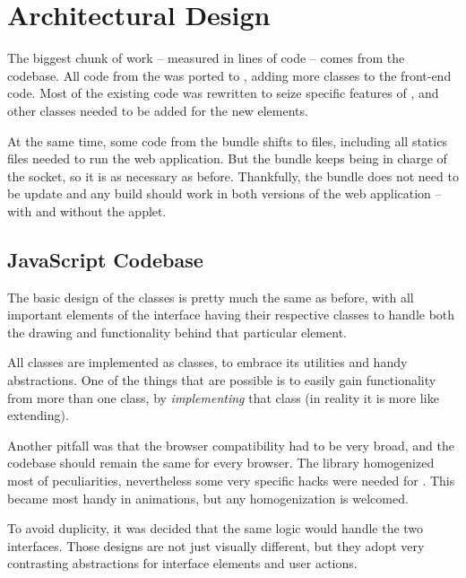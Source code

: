 \section{Architectural Design} %
\label{sec:architectural_design}

The biggest chunk of work -- measured in lines of code -- comes from the  codebase.
All code from the  was ported to , adding more classes to the front-end code.
Most of the existing code was rewritten to seize specific features of , and other classes needed to be added for the new elements.

At the same time, some code from the  bundle shifts to  files, including all statics files needed to run the web application.
But the  bundle keeps being in charge of the  socket, so it is as necessary as before.
Thankfully, the bundle does not need to be update and any build should work in both versions of the web application -- with and without the applet.

\subsection{JavaScript Codebase} %
\label{sub:javascript_codebase}

The basic design of the classes is pretty much the same as before, with all important elements of the interface having their respective classes to handle both the drawing and functionality behind that particular element.

All classes are implemented as  classes, to embrace its utilities and handy abstractions.
One of the things that are possible is to easily gain functionality from more than one class, by \emph{implementing} that  class (in reality it is more like extending).

Another pitfall was that the browser compatibility had to be very broad, and the codebase should remain the same for every browser.
The  library homogenized most of peculiarities, nevertheless some very specific hacks were needed for .
This became most handy in animations, but any  homogenization is welcomed.

To avoid duplicity, it was decided that the same  logic would handle the two interfaces.
Those designs are not just visually different, but they adopt very contrasting abstractions for interface elements and user actions.

